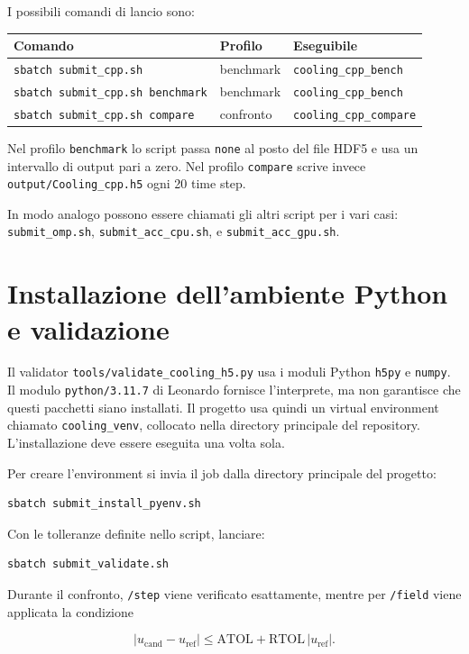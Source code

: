 \documentclass[11pt,a4paper]{article}
\begin{document}
I possibili comandi di lancio sono:

\begin{center}
\begin{tabular}{@{}lll@{}}
\toprule
Comando & Profilo & Eseguibile \\
\midrule
\texttt{sbatch submit\_cpp.sh} & benchmark & \texttt{cooling\_cpp\_bench} \\
\texttt{sbatch submit\_cpp.sh benchmark} & benchmark & \texttt{cooling\_cpp\_bench} \\
\texttt{sbatch submit\_cpp.sh compare} & confronto & \texttt{cooling\_cpp\_compare} \\
\bottomrule
\end{tabular}
\end{center}

Nel profilo \texttt{benchmark} lo script passa \texttt{none} al posto del file
HDF5 e usa un intervallo di output pari a zero. Nel profilo \texttt{compare}
scrive invece \texttt{output/Cooling\_cpp.h5} ogni 20 time step.

In modo analogo possono essere chiamati gli altri script per i vari casi: 
\texttt{submit\_omp.sh}, \texttt{submit\_acc\_cpu.sh}, e \texttt{submit\_acc\_gpu.sh}.

\section{Installazione dell'ambiente Python e validazione}

Il validator \texttt{tools/validate\_cooling\_h5.py} usa i moduli Python
\texttt{h5py} e \texttt{numpy}. Il modulo \texttt{python/3.11.7} di Leonardo
fornisce l'interprete, ma non garantisce che questi pacchetti siano installati.
Il progetto usa quindi un virtual environment chiamato
\texttt{cooling\_venv}, collocato nella directory principale del repository.
L'installazione deve essere eseguita una volta sola. 

Per creare l'environment si invia il job dalla directory principale del progetto:

\begin{lstlisting}[style=shell]
sbatch submit_install_pyenv.sh
\end{lstlisting}

Con le tolleranze definite nello script, lanciare:

\begin{lstlisting}[style=shell]
sbatch submit_validate.sh
\end{lstlisting}


Durante il confronto, \texttt{/step} viene verificato esattamente, mentre per
\texttt{/field} viene applicata la condizione

\[
  \left|u_{\mathrm{cand}}-u_{\mathrm{ref}}\right|
  \leq
  \mathrm{ATOL} + \mathrm{RTOL}\,
  \left|u_{\mathrm{ref}}\right|.
\]
\end{document}

